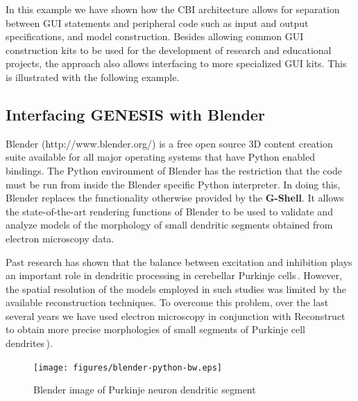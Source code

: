 \documentclass[12pt]{article}
\begin{document}


In this example we have shown how the CBI architecture allows for
separation between GUI statements and peripheral code such as input
and output specifications, and model construction.  Besides allowing common GUI construction kits to be used for the development of
research and educational projects, the approach also allows interfacing to more specialized GUI kits.  This is illustrated with the following example.

\subsection{Interfacing GENESIS with Blender}

Blender (http://www.blender.org/) is a free open source 3D content
creation suite available for all major operating systems that have
Python enabled bindings.  The Python environment of Blender has the
restriction that the code must be run from inside the Blender specific
Python interpreter. In doing this, Blender replaces the functionality otherwise
provided by the {\bf G-Shell}. It allows the state-of-the-art rendering
functions of Blender to be used to validate and analyze models of the morphology
of small dendritic segments obtained from electron microscopy data.

Past research has shown that the balance
between excitation and inhibition plays an important role in dendritic
processing in cerebellar Purkinje cells\,\cite{santamaria02:_modul_purkin,
  mittmann07:_linkin_purkin}.  However, the spatial resolution of the
models employed in such studies was limited by the available reconstruction
techniques.  To overcome this problem, over the last several years
we have used electron microscopy in conjunction with
Reconstruct\,\cite{jc05:_recon} to obtain more precise morphologies of
small segments of Purkinje cell dendrites\,\cite{huo09:_purkin,
  cornelis08:_model_neuros_genes}).

\begin{figure}[ht]
  \centering
    \texttt{[image: figures/blender-python-bw.eps]}
  \caption{Blender image of Purkinje neuron dendritic segment}
  \label{fig:cbi-blender}
\end{figure}
\end{document}
